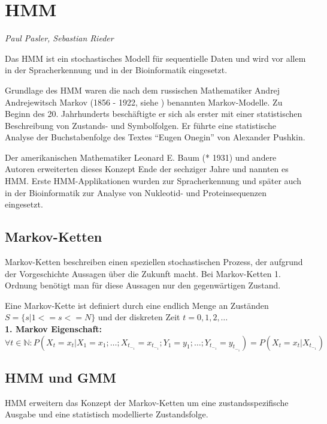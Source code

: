 ﻿\section{\acl{HMM}}
\textit{Paul Pasler, Sebastian Rieder}

Das \acl{HMM} ist ein stochastisches Modell für sequentielle Daten und wird vor allem in der Spracherkennung und in der Bioinformatik eingesetzt.

Grundlage des \acl{HMM} waren die nach dem russischen Mathematiker Andrej Andrejewitsch Markov 
(1856 - 1922, siehe \cite{wiki:markov}) benannten Markov-Modelle. Zu Beginn des 20. Jahrhunderts 
beschäftigte er sich als erster mit einer statistischen Beschreibung von Zustands- und Symbolfolgen. 
Er führte eine statistische Analyse der Buchstabenfolge des Textes ``Eugen Onegin'' von Alexander 
Pushkin.

Der amerikanischen Mathematiker Leonard E. Baum (* 1931) und andere Autoren erweiterten dieses Konzept Ende der 
sechziger Jahre und nannten es \acl{HMM}. Erste \acl{HMM}-Applikationen wurden zur Spracherkennung und später auch in der Bioinformatik 
zur Analyse von Nukleotid- und Proteinsequenzen eingesetzt. 
 
\subsection{Markov-Ketten}
Markov-Ketten beschreiben einen speziellen stochastischen Prozess, der aufgrund der Vorgeschichte Aussagen über die Zukunft macht.
Bei Markov-Ketten 1. Ordnung benötigt man für diese Aussagen nur den gegenwärtigen Zustand.


Eine Markov-Kette ist definiert durch eine endlich Menge an Zuständen \( S = \{ s | 1 <= s <= N \} \) und der diskreten Zeit \( t = 0, 1, 2, \ldots \) \\
\textbf{1. Markov Eigenschaft: } \\
\( \forall t \in \mathbb{N} : P (X_t = x_t | X_1 = x_1 ; \ldots ; X_t_-_1 = x_t_-_1 ; Y_1 = y_1 ; \ldots ; Y_t_-_1 = y_t_-_1 ) = P (X_t = x_t | X_t_-_1) \) \\


\subsection{\acl{HMM} und \acl{GMM}}
\acl{HMM} erweitern das Konzept der Markov-Ketten um eine zustandsspezifische Ausgabe und eine statistisch 
modellierte Zustandsfolge.

